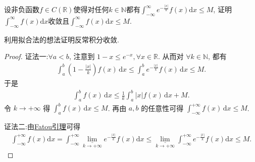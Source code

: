 \documentclass[../../main.tex]{subfiles}%
\begin{document}
\begin{example}
设非负函数$f \in C(\mathbb{R})$使得对任何$k \in \mathbb{N}$都有$\int_{-\infty}^{\infty} e^{-\frac{|x|}{k}} f(x) \mathrm{d}x \leqslant M$, 证明$\int_{-\infty}^{\infty} f(x) \mathrm{d}x$收敛且$\int_{-\infty}^{\infty} f(x) \mathrm{d}x \leqslant M$.
\end{example}
\begin{note}
利用拟合法的想法证明反常积分收敛.
\end{note}
\begin{proof}

{\color{blue} 证法一:}$\forall a < b$, 注意到 $1 - x \leqslant e^{-x}, \forall x \in \mathbb{R}$. 从而对 $\forall k \in \mathbb{N}$, 都有
\begin{align*}
\int_a^b \left( 1 - \frac{|x|}{k} \right) f(x) \, \mathrm{d}x \leqslant \int_a^b e^{-\frac{|x|}{k}} f(x) \, \mathrm{d}x \leqslant M.
\end{align*}
于是
\begin{align*}
\int_a^b f(x) \, \mathrm{d}x \leqslant \frac{1}{k} \int_a^b |x| f(x) \, \mathrm{d}x + M.
\end{align*}
令 $k \to +\infty$ 得 $\int_a^b f(x) \, \mathrm{d}x \leqslant M$. 再由 $a, b$ 的任意性可得 $\int_{-\infty}^{+\infty} f(x) \, \mathrm{d}x \leqslant M$.

{\color{blue} 证法二:}由\hyperref[Real Analysis-theorem:Fatou引理]{Fatou引理}可得
\begin{align*}
\int_{-\infty}^{+\infty}{f\left( x \right) \mathrm{d}x}=\int_{-\infty}^{+\infty}{\underset{k\rightarrow +\infty}{\underline{\lim }}e^{-\frac{\left| x \right|}{k}}f\left( x \right) \mathrm{d}x}\leqslant \underset{k\rightarrow +\infty}{\underline{\lim }}\int_{-\infty}^{+\infty}{e^{-\frac{\left| x \right|}{k}}f\left( x \right) \mathrm{d}x}\leqslant M.
\end{align*}
\end{proof}
\end{document}
